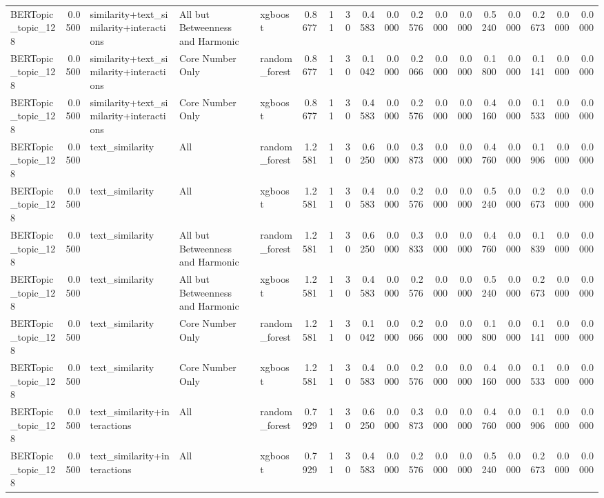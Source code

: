 \begin{tabular}{lrlllrrrrrrrrrrrrr}
BERTopic_topic_128 & 0.0500 & similarity+text_similarity+interactions & All but Betweenness and Harmonic & xgboost & 0.8677 & 11 & 30 & 0.4583 & 0.0000 & 0.2576 & 0.0000 & 0.0000 & 0.5240 & 0.0000 & 0.2673 & 0.0000 & 0.0000 \\
BERTopic_topic_128 & 0.0500 & similarity+text_similarity+interactions & Core Number Only & random_forest & 0.8677 & 11 & 30 & 0.1042 & 0.0000 & 0.2066 & 0.0000 & 0.0000 & 0.1800 & 0.0000 & 0.1141 & 0.0000 & 0.0000 \\
BERTopic_topic_128 & 0.0500 & similarity+text_similarity+interactions & Core Number Only & xgboost & 0.8677 & 11 & 30 & 0.4583 & 0.0000 & 0.2576 & 0.0000 & 0.0000 & 0.4160 & 0.0000 & 0.1533 & 0.0000 & 0.0000 \\
BERTopic_topic_128 & 0.0500 & text_similarity & All & random_forest & 1.2581 & 11 & 30 & 0.6250 & 0.0000 & 0.3873 & 0.0000 & 0.0000 & 0.4760 & 0.0000 & 0.1906 & 0.0000 & 0.0000 \\
BERTopic_topic_128 & 0.0500 & text_similarity & All & xgboost & 1.2581 & 11 & 30 & 0.4583 & 0.0000 & 0.2576 & 0.0000 & 0.0000 & 0.5240 & 0.0000 & 0.2673 & 0.0000 & 0.0000 \\
BERTopic_topic_128 & 0.0500 & text_similarity & All but Betweenness and Harmonic & random_forest & 1.2581 & 11 & 30 & 0.6250 & 0.0000 & 0.3833 & 0.0000 & 0.0000 & 0.4760 & 0.0000 & 0.1839 & 0.0000 & 0.0000 \\
BERTopic_topic_128 & 0.0500 & text_similarity & All but Betweenness and Harmonic & xgboost & 1.2581 & 11 & 30 & 0.4583 & 0.0000 & 0.2576 & 0.0000 & 0.0000 & 0.5240 & 0.0000 & 0.2673 & 0.0000 & 0.0000 \\
BERTopic_topic_128 & 0.0500 & text_similarity & Core Number Only & random_forest & 1.2581 & 11 & 30 & 0.1042 & 0.0000 & 0.2066 & 0.0000 & 0.0000 & 0.1800 & 0.0000 & 0.1141 & 0.0000 & 0.0000 \\
BERTopic_topic_128 & 0.0500 & text_similarity & Core Number Only & xgboost & 1.2581 & 11 & 30 & 0.4583 & 0.0000 & 0.2576 & 0.0000 & 0.0000 & 0.4160 & 0.0000 & 0.1533 & 0.0000 & 0.0000 \\
BERTopic_topic_128 & 0.0500 & text_similarity+interactions & All & random_forest & 0.7929 & 11 & 30 & 0.6250 & 0.0000 & 0.3873 & 0.0000 & 0.0000 & 0.4760 & 0.0000 & 0.1906 & 0.0000 & 0.0000 \\
BERTopic_topic_128 & 0.0500 & text_similarity+interactions & All & xgboost & 0.7929 & 11 & 30 & 0.4583 & 0.0000 & 0.2576 & 0.0000 & 0.0000 & 0.5240 & 0.0000 & 0.2673 & 0.0000 & 0.0000 \\

\end{tabular}
